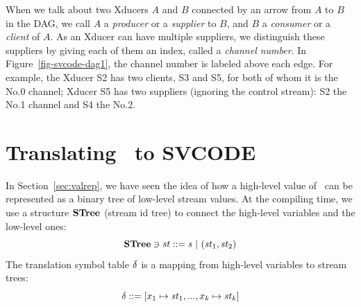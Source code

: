 
When we talk about two Xducers $A$ and $B$ connected by an arrow from $A$ to $B$ in the DAG, we call $A$ a \emph{producer} or a \emph{supplier} to $B$, and $B$ a \emph{consumer} or a \emph{client} of $A$. 
As an Xducer can have multiple suppliers, we distinguish these suppliers by giving each of them an index, called a \emph{channel number}. 
In Figure~\ref{fig-svcode-dag1}, the channel number is labeled above each edge. 
For example, the Xducer S2 has two clients, S3 and S5, for both of whom it is the No.0 channel; Xducer S5 has two suppliers (ignoring the control stream): S2 the No.1 channel and S4 the No.2. \\



\section{Translating \mysnesl \ to SVCODE}
In Section~\ref{sec:valrep}, we have seen the idea of how a high-level value of \mysnesl \ can be represented as a binary tree of low-level stream values.
At the compiling time, we use a structure $\mathbf{STree}$ (stream id tree) to connect the high-level variables and the low-level ones: 
$$ \STree \ni \st ::= \s \ | \ (\st_1,\st_2) $$
The translation symbol table $\delta$ is a mapping from high-level variables to stream trees:
 $$\del ::= [x_1 \|-> \st_1,..., x_k \|-> {\st_k}] $$ 

